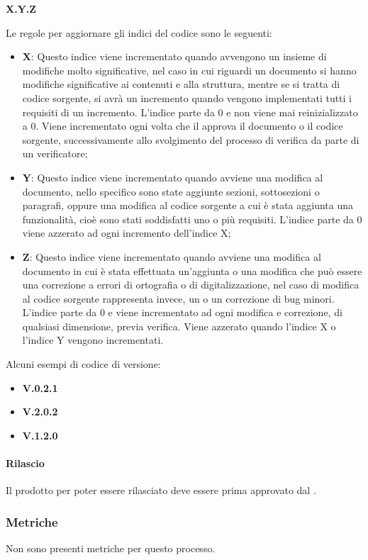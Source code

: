 \begin{center}
	\textbf{X.Y.Z}
\end{center}
Le regole per aggiornare gli indici del codice sono le seguenti:
\begin{itemize}
	\item \textbf{X}: Questo indice viene incrementato quando avvengono un insieme di modifiche molto significative, nel caso in cui riguardi un documento si hanno modifiche significative ai contenuti e alla struttura, mentre se si tratta di codice sorgente, si avrà un incremento quando vengono implementati tutti i requisiti di un incremento.
	L'indice parte da 0 e non viene mai reinizializzato a 0. Viene incrementato ogni volta che il \Responsabile{} approva il documento o il codice sorgente, successivamente allo svolgimento del processo di verifica da parte di un verificatore;
	\item \textbf{Y}: Questo indice viene incrementato quando avviene una modifica al documento, nello specifico sono state aggiunte sezioni, sottosezioni o paragrafi, oppure una modifica al codice sorgente a cui è stata aggiunta una funzionalità, cioè sono stati soddisfatti uno o più requisiti.
	L'indice parte da 0 viene azzerato ad ogni incremento dell'indice X;
	\item \textbf{Z}: Questo indice viene incrementato quando avviene una modifica al documento in cui è stata effettuata un'aggiunta o una modifica che può essere una correzione a errori di ortografia o di digitalizzazione, nel caso di modifica al codice sorgente rappresenta invece, un  o un correzione di bug minori.
	L'indice parte da 0 e viene incrementato ad ogni modifica e correzione, di qualsiasi dimensione, previa verifica.
	Viene azzerato quando l'indice X o l'indice Y vengono incrementati.
\end{itemize}
Alcuni esempi di codice di versione:
\begin{itemize}
	\item \textbf{V.0.2.1}
	\item \textbf{V.2.0.2}
	\item \textbf{V.1.2.0}
\end{itemize}
\paragraph*{Rilascio}
Il prodotto per poter essere rilasciato deve essere prima approvato dal \Responsabile{}.

\subsubsection{Metriche}
Non sono presenti metriche per questo processo.

